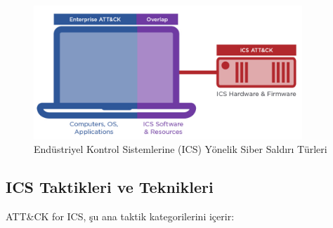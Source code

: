 \begin{figure}[H]
    \centering
    \includegraphics[width=0.9\textwidth]{img/attack-ICS.png}
    \caption{Endüstriyel Kontrol Sistemlerine (ICS) Yönelik Siber Saldırı Türleri}
    \label{fig:attack-ics}
\end{figure}

\subsection{ICS Taktikleri ve Teknikleri}

ATT\&CK for ICS, şu ana taktik kategorilerini içerir:

